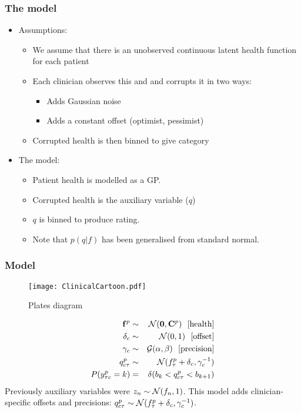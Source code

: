 \begin{frame}
	\frametitle{The model}
		\begin{itemize}
		\item Assumptions:
			\begin{itemize}
				\item We assume that there is an unobserved continuous latent health function for each patient
				\item Each clinician observes this and and corrupts it in two ways:
					\begin{itemize}
						\item Adds Gaussian noise
						\item Adds a constant offset (optimist, pessimist)
					\end{itemize}
				\item Corrupted health is then binned to give category
			\end{itemize}
		\item<2-> The model:
		\begin{itemize}
			\item Patient health is modelled as a GP.
			\item Corrupted health is the auxiliary variable ($q$)
			\item $q$ is binned to produce rating.
			\item Note that $p(q|f)$ has been generalised from standard normal.
		\end{itemize}
	\end{itemize}
\end{frame}

\begin{frame}
	\frametitle{Model}
	\begin{multicols}{2}
		\begin{figure}[tbh]
			\centering\texttt{[image: ClinicalCartoon.pdf]}
			\centering\caption{\label{fig:clincartoon}Plates diagram}
		\end{figure}
		\newpage
		\begin{eqnarray}
			\nonumber \mathbf{f}^p &\sim & {\cal N}(\mathbf{0},\mathbf{C}^p)~~\mbox{[health]}\\
			\nonumber \delta_c &\sim & {\cal N}(0,1)~~\mbox{[offset]}\\
			\nonumber \gamma_c &\sim & {\cal G}(\alpha,\beta)~~\mbox{[precision]}\\
			\nonumber q_{c\tau}^p &\sim & {\cal N}(f_\tau^p + \delta_c,\gamma_c^{-1})\\
			\nonumber P(y_{\tau c}^p=k) &=& \delta(b_k < q_{c\tau}^p < b_{k+1})
		\end{eqnarray}
		Previously auxiliary variables were $z_n\sim {\cal N}(f_n,1)$. This model adds clinician-specific offsets and precisions: $q_{c\tau}^p \sim  {\cal N}(f_\tau^p + \delta_c,\gamma_c^{-1})$.
	\end{multicols}
\end{frame}

